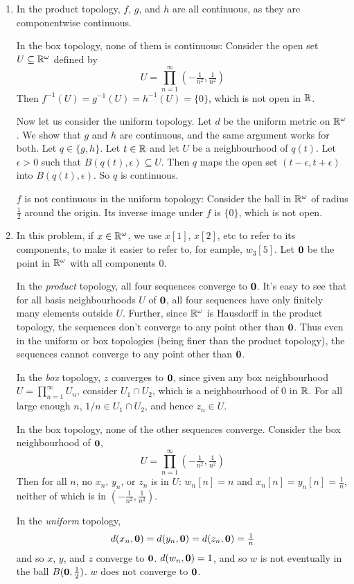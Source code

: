 \begin{enumerate}
\item In the product topology, $f$, $g$, and $h$ are all continuous, as they are componentwise continuous.

In the box topology, none of them is continuous: Consider the open set $U \subseteq \mathbb R^\omega$ defined by
\[U = \prod_{n=1}^\infty \left(-\tfrac{1}{n^2}, \tfrac{1}{n^2} \right)\]
Then $f^{-1}(U) = g^{-1}(U) = h^{-1}(U) = \{0\}$, which is not open in $\mathbb R$.

Now let us consider the uniform topology. Let $d$ be the uniform metric on $\mathbb R^\omega$. We show that $g$ and $h$ are continuous, and the same argument works for both. Let $q \in \{g,h\}$. Let $t \in \mathbb R$ and let $U$ be a neighbourhood of $q(t)$. Let $\epsilon > 0$ such that $B(q(t), \epsilon) \subseteq U$. Then $q$ maps the open set $(t-\epsilon, t+\epsilon)$ into $B(q(t), \epsilon)$. So $q$ is continuous.

$f$ is not continuous in the uniform topology: Consider the ball in $\mathbb R^\omega$ of radius $\frac12$ around the origin. Its inverse image under $f$ is $\{0\}$, which is not open.

\item In this problem, if $x \in \mathbb R^\omega$, we use $x[1]$, $x[2]$, etc to refer to its components, to make it easier to refer to, for eample, $w_3[5]$. Let $\mathbf 0$ be the point in $\mathbb R^\omega$ with all components $0$.

In the \emph{product} topology, all four sequences converge to $\mathbf 0$. It's easy to see that for all basis neighbourhoods $U$ of $\mathbf 0$, all four sequences have only finitely many elements outside $U$. Further, since $\mathbb R^\omega$ is Hausdorff in the product topology, the sequences don't converge to any point other than $\mathbf 0$. Thus even in the uniform or box topologies (being finer than the product topology), the sequences cannot converge to any point other than $\mathbf 0$.

In the \emph{box} topology, $z$ converges to $\mathbf 0$, since given any box neighbourhood $U = \prod_{n=1}^\infty U_n$, consider $U_1 \cap U_2$, which is a neighbourhood of $0$ in $\mathbb R$. For all large enough $n$, $1/n \in U_1 \cap U_2$, and hence $z_n \in U$.

In the box topology, none of the other sequences converge. Consider the box neighbourhood of $\mathbf 0$,
\[U = \prod_{n=1}^\infty \left(-\tfrac{1}{n^2}, \tfrac{1}{n^2} \right)\]
Then for all $n$, no $x_n$, $y_n$, or $z_n$ is in $U$: $w_n[n] = n$ and $x_n[n] = y_n[n] = \frac1n$, neither of which is in $(-\frac{1}{n^2}, \frac{1}{n^2})$.

In the \emph{uniform} topology,
\[d(x_n,\mathbf 0) = d(y_n,\mathbf 0) = d(z_n, \mathbf 0) = \tfrac1n\]
and so $x$, $y$, and $z$ converge to $\mathbf 0$. $d(w_n, \mathbf 0) = 1$, and so $w$ is not eventually in the ball $B(\mathbf 0, \frac12)$. $w$ does not converge to $\mathbf 0$.
\end{enumerate}

